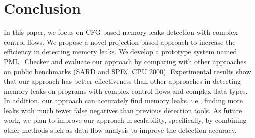 \section{Conclusion}\label{sec:conclusion}

In this paper, we focus on CFG based memory leaks detection with complex control flows. We propose a novel projection-based approach to increase the efficiency in detecting memory leaks. We develop a prototype system named PML\_Checker and evaluate our approach by comparing with other approaches on public benchmarks (SARD and SPEC CPU $2000$). Experimental results show that our approach has better effectiveness than other approaches in detecting memory leaks on programs with complex control flows and complex data types. In addition, our approach can accurately find memory leaks, i.e., finding more leaks with much fewer false negatives than previous detection tools. As future work, we plan to improve our approach in scalability, specifically, by combining other methods such as data flow analysis to improve the detection accuracy.